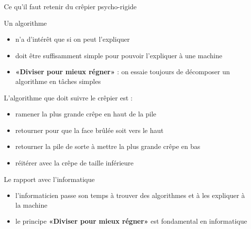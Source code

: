 \begin{frame}{Ce qu'il faut retenir du  crêpier psycho-rigide}

  \begin{block}{Un algorithme}
    \begin{itemize}
    \item n'a d'intérêt que si on peut l'expliquer
    \item doit être suffisamment simple pour pouvoir l'expliquer à une machine
    \item \alert{\textbf{«Diviser pour mieux régner»}} : on essaie toujours de décomposer un algorithme en tâches simples
    \end{itemize}
  \end{block}

  \begin{block}{L'algorithme que doit suivre le crêpier est :}
    \begin{itemize}
    \item ramener la plus grande crêpe en haut de la pile
    \item retourner pour que la face brûlée soit vers le haut
    \item retourner la pile de sorte à mettre la plus grande crêpe en bas
    \item réitérer avec la crêpe de taille inférieure
    \end{itemize}
  \end{block}

  \begin{block}{Le rapport avec l'informatique}
    \begin{itemize}
    \item l'informaticien passe son temps à trouver des algorithmes et  à les expliquer à la machine
    \item le principe \alert{\textbf{«Diviser pour mieux régner»}} est fondamental en informatique
    \end{itemize}
  \end{block}
\end{frame}
